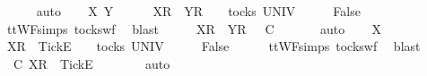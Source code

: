 \begin{isabellebody}
\ \ \ \ \isamarkupfalse%
\ auto\isanewline
{}\isamarkupfalse%
\isanewline
\ \ \isamarkupfalse%
\ X\ Y\ {\isasymrho}\ {\isasymsigma}{\isacharprime}{\isacharprime}\isanewline
\ \ \isamarkupfalse%
\ {\isachardoublequoteopen}{\isacharbrackleft}X{\isacharbrackright}\isactrlsub R\ {\isacharhash}\ {\isacharbrackleft}Y{\isacharbrackright}\isactrlsub R\ {\isacharhash}\ {\isasymrho}\ {\isasymin}\ tocks\ UNIV{\isachardoublequoteclose}\isanewline
\ \ \isamarkupfalse%
\ \isamarkupfalse%
\ {\isachardoublequoteopen}False{\isachardoublequoteclose}\isanewline
\ \ \ \ \isamarkupfalse%
\ ttWF{\isachardot}simps{\isacharparenleft}{}{}{\isacharparenright}\ tocks{\isacharunderscore}wf\ \isamarkupfalse%
\ blast\isanewline
\ \ \isamarkupfalse%
\ \isamarkupfalse%
\ {\isachardoublequoteopen}{\isacharbrackleft}X{\isacharbrackright}\isactrlsub R\ {\isacharhash}\ {\isacharbrackleft}Y{\isacharbrackright}\isactrlsub R\ {\isacharhash}\ {\isasymrho}\ {\isasymlesssim}\isactrlsub C\ {\isasymsigma}{\isacharprime}{\isacharprime}{\isachardoublequoteclose}\isanewline
\ \ \ \ \isamarkupfalse%
\ auto\isanewline
{}\isamarkupfalse%
\isanewline
\ \ \isamarkupfalse%
\ X\ {\isasymrho}\ {\isasymsigma}{\isacharprime}{\isacharprime}\isanewline
\ \ \isamarkupfalse%
\ {\isachardoublequoteopen}{\isacharbrackleft}X{\isacharbrackright}\isactrlsub R\ {\isacharhash}\ {\isacharbrackleft}Tick{\isacharbrackright}\isactrlsub E\ {\isacharhash}\ {\isasymsigma}{\isacharprime}{\isacharprime}\ {\isasymin}\ tocks\ UNIV{\isachardoublequoteclose}\isanewline
\ \ \isamarkupfalse%
\ \isamarkupfalse%
\ {\isachardoublequoteopen}False{\isachardoublequoteclose}\isanewline
\ \ \ \ \isamarkupfalse%
\ ttWF{\isachardot}simps{\isacharparenleft}{}{}{\isacharparenright}\ tocks{\isacharunderscore}wf\ \isamarkupfalse%
\ blast\isanewline
\ \ \isamarkupfalse%
\ \isamarkupfalse%
\ {\isachardoublequoteopen}{\isasymrho}\ {\isasymlesssim}\isactrlsub C\ {\isacharbrackleft}X{\isacharbrackright}\isactrlsub R\ {\isacharhash}\ {\isacharbrackleft}Tick{\isacharbrackright}\isactrlsub E\ {\isacharhash}\ {\isasymsigma}{\isacharprime}{\isacharprime}{\isachardoublequoteclose}\isanewline
\ \ \ \ \isamarkupfalse%
\ auto\isanewline
{}\isamarkupfalse%
\isanewline

\end{isabellebody}
